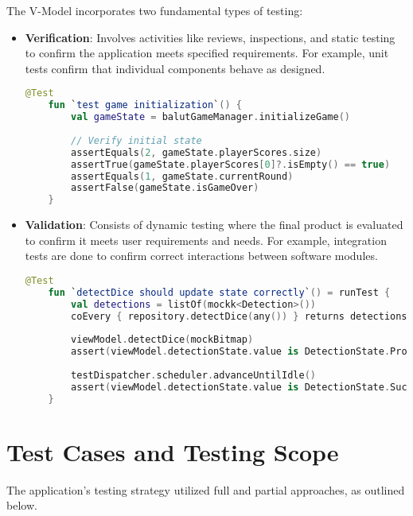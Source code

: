 The V-Model incorporates two fundamental types of testing:
\begin{itemize}
    \item \textbf{Verification}: Involves activities like reviews, inspections, and static testing to confirm the application meets specified requirements. For example, unit tests confirm that individual components behave as designed.
    \begin{lstlisting}[language=Kotlin, caption=Unit Test for Game Initialization, label=lst:unit_game_init]
    @Test
    fun `test game initialization`() {
        val gameState = balutGameManager.initializeGame()
            
        // Verify initial state
        assertEquals(2, gameState.playerScores.size)
        assertTrue(gameState.playerScores[0]?.isEmpty() == true)
        assertEquals(1, gameState.currentRound)
        assertFalse(gameState.isGameOver)
    }
    \end{lstlisting}
    \label{lst:unit_game_init}
    \item \textbf{Validation}: Consists of dynamic testing where the final product is evaluated to confirm it meets user requirements and needs. For example, integration tests are done to confirm correct interactions between software modules.
    \begin{lstlisting}[language=Kotlin, caption=Integration Test for Dice Detection, label=lst:integration_dice_detection]
    @Test
    fun `detectDice should update state correctly`() = runTest {
        val detections = listOf(mockk<Detection>())
        coEvery { repository.detectDice(any()) } returns detections
            
        viewModel.detectDice(mockBitmap)
        assert(viewModel.detectionState.value is DetectionState.Processing)
            
        testDispatcher.scheduler.advanceUntilIdle()
        assert(viewModel.detectionState.value is DetectionState.Success)
    } 
    \end{lstlisting}
    \label{lst:integration_dice_detection}
\end{itemize}


\section{Test Cases and Testing Scope}

The application's testing strategy utilized full and partial approaches, as outlined below.


